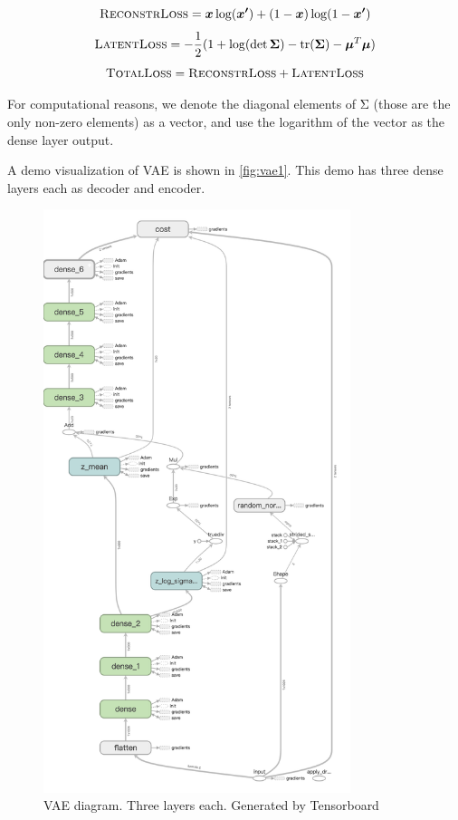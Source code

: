 \documentclass[a4paper,10pt,UTF8]{article}
\newcommand*{\mat}[1]{\boldsymbol{\mathrm{#1}}}
\renewcommand*{\vec}[1]{\boldsymbol{#1}}
\numberwithin{equation}{section}
\numberwithin{figure}{section}
\begin{document}
\begin{equation}
    \textsc{ReconstrLoss} = \vec{x} \log (\vec{x'}) + (1 - \vec{x}) \log (1 - \vec{x'})
\end{equation}
\begin{equation}
    \textsc{LatentLoss} = - \frac{1}{2} (1 + \log(\det \mat{\Sigma}) - \mathrm{tr}(\mat{\Sigma}) - \vec{\mu}^T \vec{\mu})
\end{equation}
\begin{equation}
    \textsc{TotalLoss} = \textsc{ReconstrLoss} + \textsc{LatentLoss}
\end{equation}

For computational reasons, we denote the diagonal elements of $\mat{\Sigma}$ (those are the only non-zero elements) as a vector, and use the logarithm of the vector as the dense layer output.

A demo visualization of VAE is shown in \autoref{fig:vae1}. This demo  has three dense layers each as decoder and encoder. 

\begin{figure}[htbp]
\centering
\includegraphics[width=0.8\textwidth]{img/vae1.png}
\caption{VAE diagram. Three layers each. Generated by Tensorboard}
\label{fig:vae1}
\end{figure}
\end{document}
